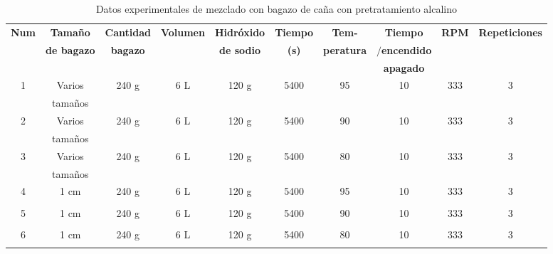\documentclass[12pt]{article}
\begin{document}
		\begin{table}[h!]
			\centering
			\caption{Datos experimentales de mezclado con bagazo de caña con pretratamiento alcalino}
			\label{datos experimentales}
			\resizebox{16cm}{!} {
				\begin{tabular}{|c|c|c|c|c|c|c|c|c| c| }
					\hline
					\textbf{Num} & \textbf{Tamaño } & \textbf{Cantidad } & \textbf{Volumen} & \textbf{Hidróxido} & \textbf{Tiempo} & \textbf{Tem-} & \textbf{Tiempo} & \textbf{RPM} & \textbf{Repeticiones}\\
					& \textbf{ de bagazo} & \textbf{ bagazo} & & \textbf{de sodio} & \textbf{(s)} & \textbf{peratura}&  \textbf{ $/$encendido}& &  \\
					
					& &  & &  &  &  &\textbf{ apagado} & & \\
					
					
					\hline
					1 & Varios & 240 g & 6 L & 120 g & 5400 & 95 & 10 &  333 & 3 \\
					& tamaños & &  & &  &   &  & & \\	\hline
					
					
					2 & Varios & 240 g & 6 L & 120 g & 5400 & 90 & 10 & 333 & 3 \\
					& tamaños & &  & &  &   &  & & \\	\hline
					
					
					3 & Varios & 240 g & 6 L & 120 g & 5400 & 80 & 10 & 333& 3 \\
					& tamaños & &  & &  &   &  & & \\	\hline
					
					
					
					4 & 1 cm & 240 g & 6 L & 120 g & 5400 & 95 & 10 &   333& 3 \\
					& & &  & &  &   &  & & \\	\hline
					
					
					5 & 1 cm & 240 g & 6 L & 120 g & 5400 & 90 & 10 &  333 & 3 \\  
					& & &  & &  &   &  & & \\	\hline
					
					6 & 1 cm & 240 g & 6 L & 120 g & 5400 & 80 & 10 &  333 & 3 \\  
					& & &  & &  &   &  & & \\	
					\hline
				\end{tabular}
			}
			
		\end{table}
		
		
\end{document}
